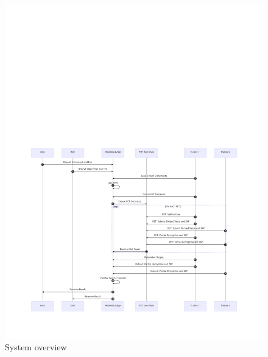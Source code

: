 \begin{figure}[h]
	\includegraphics[width=1\textwidth]{figures/abstentia.pdf}
	\caption{System overview}
	\centering
	\label{fig:system}
\end{figure}





